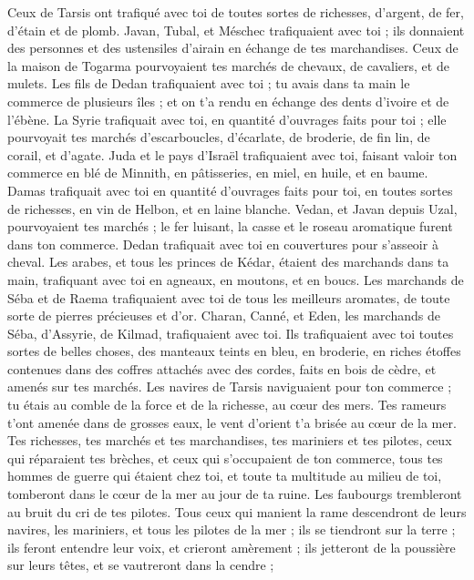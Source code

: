 \begin{multicols}{2}
Ceux de Tarsis ont trafiqué avec toi de toutes sortes de richesses, d'argent, de fer, d'étain et de plomb.
Javan, Tubal, et Méschec trafiquaient avec toi ; ils donnaient des personnes et des ustensiles d'airain en échange de tes marchandises.
Ceux de la maison de Togarma pourvoyaient tes marchés de chevaux, de cavaliers, et de mulets.
Les fils de Dedan trafiquaient avec toi ; tu avais dans ta main le commerce de plusieurs îles ; et on t'a rendu en échange des dents d'ivoire et de l'ébène.
La Syrie trafiquait avec toi, en quantité d'ouvrages faits pour toi ; elle pourvoyait tes marchés d'escarboucles, d'écarlate, de broderie, de fin lin, de corail, et d'agate.
Juda et le pays d'Israël trafiquaient avec toi, faisant valoir ton commerce en blé de Minnith, en pâtisseries, en miel, en huile, et en baume.
Damas trafiquait avec toi en quantité d'ouvrages faits pour toi, en toutes sortes de richesses, en vin de Helbon, et en laine blanche.
Vedan, et Javan depuis Uzal, pourvoyaient tes marchés ; le fer luisant, la casse et le roseau aromatique furent dans ton commerce.
Dedan trafiquait avec toi en couvertures pour s'asseoir à cheval.
Les arabes, et tous les princes de Kédar, étaient des marchands dans ta main, trafiquant avec toi en agneaux, en moutons, et en boucs.
Les marchands de Séba et de Raema trafiquaient avec toi de tous les meilleurs aromates, de toute sorte de pierres précieuses et d'or.
Charan, Canné, et Eden, les marchands de Séba, d'Assyrie, de Kilmad, trafiquaient avec toi.
Ils trafiquaient avec toi toutes sortes de belles choses, des manteaux teints en bleu, en broderie, en riches étoffes contenues dans des coffres attachés avec des cordes, faits en bois de cèdre, et amenés sur tes marchés.
Les navires de Tarsis naviguaient pour ton commerce ; tu étais au comble de la force et de la richesse, au cœur des mers.
Tes rameurs t'ont amenée dans de grosses eaux, le vent d'orient t'a brisée au cœur de la mer.
Tes richesses, tes marchés et tes marchandises, tes mariniers et tes pilotes, ceux qui réparaient tes brèches, et ceux qui s'occupaient de ton commerce, tous tes hommes de guerre qui étaient chez toi, et toute ta multitude au milieu de toi, tomberont dans le cœur de la mer au jour de ta ruine.
Les faubourgs trembleront au bruit du cri de tes pilotes.
Tous ceux qui manient la rame descendront de leurs navires, les mariniers, et tous les pilotes de la mer ; ils se tiendront sur la terre ;
ils feront entendre leur voix, et crieront amèrement ; ils jetteront de la poussière sur leurs têtes, et se vautreront dans la cendre ;

\end{multicols}
